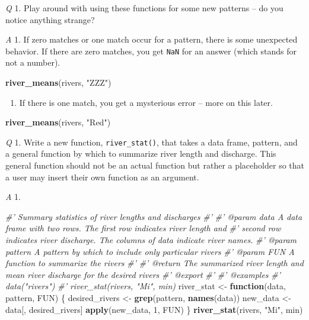 \documentclass[
]{book}
\newenvironment{Shaded}{\begin{snugshade}}{\end{snugshade}}
\newcommand{\CommentTok}[1]{\textcolor[rgb]{0.56,0.35,0.01}{\textit{#1}}}
\newcommand{\ControlFlowTok}[1]{\textcolor[rgb]{0.13,0.29,0.53}{\textbf{#1}}}
\newcommand{\DecValTok}[1]{\textcolor[rgb]{0.00,0.00,0.81}{#1}}
\newcommand{\KeywordTok}[1]{\textcolor[rgb]{0.13,0.29,0.53}{\textbf{#1}}}
\newcommand{\NormalTok}[1]{#1}
\newcommand{\StringTok}[1]{\textcolor[rgb]{0.31,0.60,0.02}{#1}}
\providecommand{\tightlist}{%
  \setlength{\itemsep}{0pt}\setlength{\parskip}{0pt}}
\begin{document}
\emph{Q} 1. Play around with using these functions for some new patterns -- do you notice anything strange?

\emph{A} 1. If zero matches or one match occur for a pattern, there is some unexpected behavior. If there are zero matches, you get \texttt{NaN} for an answer (which stands for not a number).

\begin{Shaded}
\begin{Highlighting}[]
\KeywordTok{river_means}\NormalTok{(rivers, }\StringTok{"ZZZ"}\NormalTok{)}
\end{Highlighting}
\end{Shaded}

\begin{enumerate}
\def\labelenumi{\arabic{enumi}.}
\setcounter{enumi}{1}
\tightlist
\item
  If there is one match, you get a mysterious error -- more on this later.
\end{enumerate}

\begin{Shaded}
\begin{Highlighting}[]
\KeywordTok{river_means}\NormalTok{(rivers, }\StringTok{"Red"}\NormalTok{)}
\end{Highlighting}
\end{Shaded}

\emph{Q} 1. Write a new function, \texttt{river\_stat()}, that takes a data frame, pattern, and a general function by which to summarize river length and discharge. This general function should not be an actual function but rather a placeholder so that a user may insert their own function as an argument.

\emph{A} 1.

\begin{Shaded}
\begin{Highlighting}[]
\CommentTok{#' Summary statistics of river lengths and discharges}
\CommentTok{#'}
\CommentTok{#' @param data A data frame with two rows. The first row indicates river length and}
\CommentTok{#'   second row indicates river discharge. The columns of data indicate river names.}
\CommentTok{#' @param pattern A pattern by which to include only particular rivers}
\CommentTok{#' @param FUN A function to summarize the rivers}
\CommentTok{#'}
\CommentTok{#' @return The summarized river length and mean river discharge for the desired rivers}
\CommentTok{#' @export}
\CommentTok{#'}
\CommentTok{#' @examples}
\CommentTok{#' data("rivers")}
\CommentTok{#' river_stat(rivers, "Mi", min)}
\NormalTok{river_stat <-}\StringTok{ }\ControlFlowTok{function}\NormalTok{(data, pattern, FUN) \{}
\NormalTok{  desired_rivers <-}\StringTok{ }\KeywordTok{grep}\NormalTok{(pattern, }\KeywordTok{names}\NormalTok{(data))}
\NormalTok{  new_data <-}\StringTok{ }\NormalTok{data[, desired_rivers]}
  \KeywordTok{apply}\NormalTok{(new_data, }\DecValTok{1}\NormalTok{, FUN)}
\NormalTok{\}}
\KeywordTok{river_stat}\NormalTok{(rivers, }\StringTok{"Mi"}\NormalTok{, min)}
\end{Highlighting}
\end{Shaded}
\end{document}
